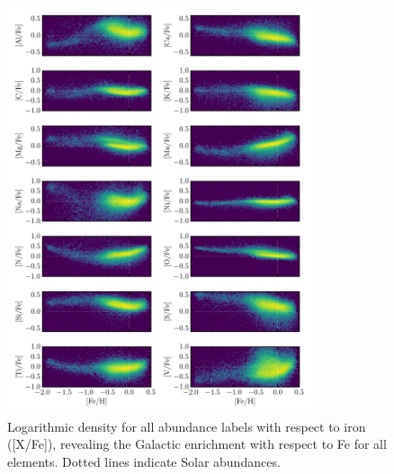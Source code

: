 \documentclass[12pt,preprint]{aastex6}
\begin{document}
\begin{figure}[p]
\centering
\includegraphics[width=0.8\textwidth]{test-step-gce.pdf}
\caption{Logarithmic density for all abundance labels with respect to iron ([X/Fe]), revealing the Galactic  enrichment with respect to Fe for all elements. Dotted lines indicate Solar abundances.\label{fig:gce}}
\end{figure}

\clearpage
\end{document}
